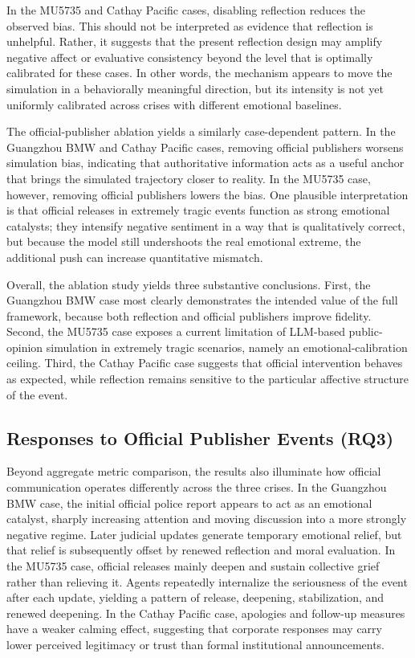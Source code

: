 \documentclass[11pt]{article}
\begin{document}
In the MU5735 and Cathay Pacific cases, disabling reflection reduces the observed bias. This should not be interpreted as evidence that reflection is unhelpful. Rather, it suggests that the present reflection design may amplify negative affect or evaluative consistency beyond the level that is optimally calibrated for these cases. In other words, the mechanism appears to move the simulation in a behaviorally meaningful direction, but its intensity is not yet uniformly calibrated across crises with different emotional baselines.

The official-publisher ablation yields a similarly case-dependent pattern. In the Guangzhou BMW and Cathay Pacific cases, removing official publishers worsens simulation bias, indicating that authoritative information acts as a useful anchor that brings the simulated trajectory closer to reality. In the MU5735 case, however, removing official publishers lowers the bias. One plausible interpretation is that official releases in extremely tragic events function as strong emotional catalysts; they intensify negative sentiment in a way that is qualitatively correct, but because the model still undershoots the real emotional extreme, the additional push can increase quantitative mismatch.

Overall, the ablation study yields three substantive conclusions. First, the Guangzhou BMW case most clearly demonstrates the intended value of the full framework, because both reflection and official publishers improve fidelity. Second, the MU5735 case exposes a current limitation of LLM-based public-opinion simulation in extremely tragic scenarios, namely an emotional-calibration ceiling. Third, the Cathay Pacific case suggests that official intervention behaves as expected, while reflection remains sensitive to the particular affective structure of the event.

\subsection{Responses to Official Publisher Events (RQ3)}
Beyond aggregate metric comparison, the results also illuminate how official communication operates differently across the three crises. In the Guangzhou BMW case, the initial official police report appears to act as an emotional catalyst, sharply increasing attention and moving discussion into a more strongly negative regime. Later judicial updates generate temporary emotional relief, but that relief is subsequently offset by renewed reflection and moral evaluation. In the MU5735 case, official releases mainly deepen and sustain collective grief rather than relieving it. Agents repeatedly internalize the seriousness of the event after each update, yielding a pattern of release, deepening, stabilization, and renewed deepening. In the Cathay Pacific case, apologies and follow-up measures have a weaker calming effect, suggesting that corporate responses may carry lower perceived legitimacy or trust than formal institutional announcements.
\end{document}
